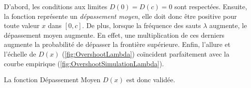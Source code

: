 D'abord, les conditions aux limites $D(0)=D(c)=0$ sont respectées. Ensuite, la fonction représente un \textit{dépassement moyen}, elle doit donc être positive pour toute valeur $x$ dans $[0,c]$. De plus, lorsque la fréquence des sauts \(\lambda\) augmente, le dépassement moyen augmente. En effet, une multiplication de ces derniers augmente la probabilité de dépasser la frontière supérieure. Enfin, l'allure et l'échelle de \(D(x)\) (\ref{fig:OvershootLambda}) coïncident parfaitement avec la courbe empirique (\ref{fig:OvershootSimulationLambda}). 

La fonction Dépassement Moyen $D(x)$ est donc validée.
